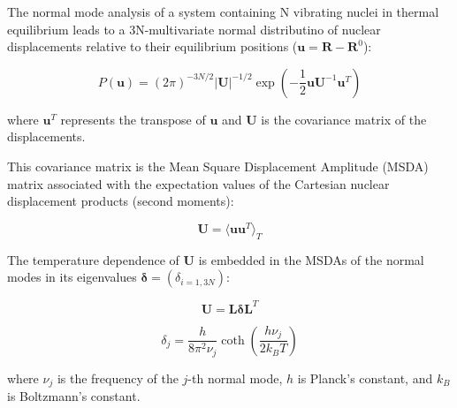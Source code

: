 The normal mode analysis of a system containing N vibrating nuclei in thermal equilibrium
leads to a 3N-multivariate normal distributino of nuclear displacements relative to their
equilibrium positions ($\mathbf{u} = \mathbf{R} - \mathbf{R}^0$):

$$
P(\mathbf{u}) = (2\pi)^{-3N/2} |\mathbf{U}|^{-1/2} \exp\left(-\frac{1}{2} \mathbf{u} \mathbf{U}^{-1} \mathbf{u}^T\right)
$$

where $\mathbf{u}^T$ represents the transpose of $\mathbf{u}$ and $\mathbf{U}$ is the covariance matrix of the displacements.

This covariance matrix is the  Mean Square Displacement Amplitude (MSDA) matrix associated with the
expectation values of the Cartesian nuclear displacement products (second moments):

$$
\mathbf{U} = \langle \mathbf{u} \mathbf{u}^T \rangle_T
$$

The temperature dependence of $\mathbf{U}$ is embedded in the MSDAs of the normal modes in its eigenvalues
$\mathbf{\delta} = (\delta_{i=1,3N})$:

$$
\mathbf{U} = \mathbf{L} \mathbf{\delta} \mathbf{L}^T
$$

$$
\delta_j = \frac{h}{8 \pi^2 \nu_j} \coth\left( \frac{h \nu_j}{2 k_B T} \right)
$$

where $\nu_j$ is the frequency of the $j$-th normal mode, $h$ is Planck's constant, and $k_B$ is Boltzmann's constant.

